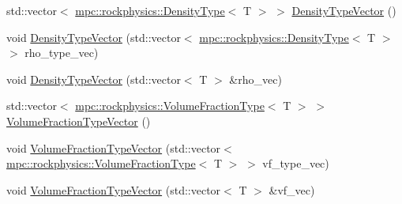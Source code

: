 \begin{DoxyCompactItemize}
\item 
std\+::vector$<$ \mbox{\hyperlink{structmpc_1_1rockphysics_1_1_density_type}{mpc\+::rockphysics\+::\+Density\+Type}}$<$ T $>$ $>$ \mbox{\hyperlink{classmpc_1_1rockphysics_1_1_scalar_composites_base_a93d459f2440b68c970864abd93e3934a}{Density\+Type\+Vector}} ()
\item 
void \mbox{\hyperlink{classmpc_1_1rockphysics_1_1_scalar_composites_base_af1816d0fc643a2b28f64a7bef9d883ca}{Density\+Type\+Vector}} (std\+::vector$<$ \mbox{\hyperlink{structmpc_1_1rockphysics_1_1_density_type}{mpc\+::rockphysics\+::\+Density\+Type}}$<$ T $>$ $>$ rho\+\_\+type\+\_\+vec)
\item 
void \mbox{\hyperlink{classmpc_1_1rockphysics_1_1_scalar_composites_base_ad5f467744173a292381953a3e6837aa7}{Density\+Type\+Vector}} (std\+::vector$<$ T $>$ \&rho\+\_\+vec)
\item 
std\+::vector$<$ \mbox{\hyperlink{structmpc_1_1rockphysics_1_1_volume_fraction_type}{mpc\+::rockphysics\+::\+Volume\+Fraction\+Type}}$<$ T $>$ $>$ \mbox{\hyperlink{classmpc_1_1rockphysics_1_1_scalar_composites_base_a22661d718d18f1843d1f1ba26e1ba060}{Volume\+Fraction\+Type\+Vector}} ()
\item 
void \mbox{\hyperlink{classmpc_1_1rockphysics_1_1_scalar_composites_base_a598629f41f16c63a131a1733d13f63dd}{Volume\+Fraction\+Type\+Vector}} (std\+::vector$<$ \mbox{\hyperlink{structmpc_1_1rockphysics_1_1_volume_fraction_type}{mpc\+::rockphysics\+::\+Volume\+Fraction\+Type}}$<$ T $>$ $>$ vf\+\_\+type\+\_\+vec)
\item 
void \mbox{\hyperlink{classmpc_1_1rockphysics_1_1_scalar_composites_base_a5b7ed116d7ae42d8119b3b7481998863}{Volume\+Fraction\+Type\+Vector}} (std\+::vector$<$ T $>$ \&vf\+\_\+vec)
\end{DoxyCompactItemize}
